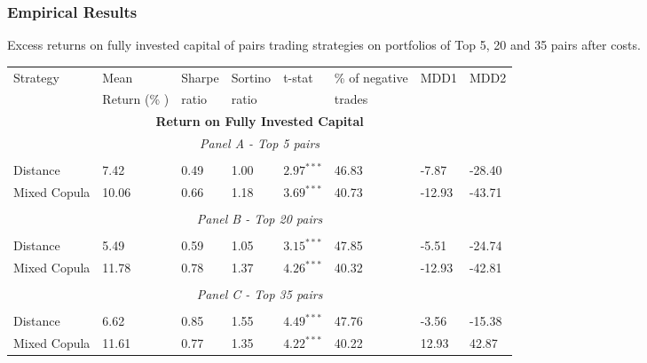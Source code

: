 \documentclass[pdf,9pt,xcolor=dvipsnames,hide notes]{beamer}
\begin{document}
\begin{frame}
	\frametitle{Empirical Results}
	\begin{threeparttable}[H]
		\centering \tiny
		\caption{Excess returns on fully invested capital of pairs trading strategies on portfolios of Top 5, 20 and 35 pairs after costs. }
		\begin{tabularx}{\textwidth}{@{\extracolsep{\fill}}llllllll@{}}
			\toprule
			Strategy & Mean  & Sharpe & Sortino & t-stat & \% of negative   & MDD1 & MDD2 \\
			& Return (\% ) & ratio &  ratio     &  &  trades     &       &  \\
			\midrule
			\multicolumn{8}{c}{\textbf{Return on Fully Invested Capital}} \\
			\multicolumn{8}{c}{\textit{Panel A - Top 5 pairs}} \\
			&       &       &       &       &       &       &  \\
			Distance & 7.42  & 0.49  & 1.00  & $2.97^{***}$  & 46.83 & -7.87    & -28.40 \\
			Mixed Copula & 10.06  & 0.66  & 1.18  & $3.69^{***}$  & 40.73 & -12.93  & -43.71 \\
			\multicolumn{1}{r}{} & \multicolumn{1}{r}{} & \multicolumn{1}{r}{} & \multicolumn{1}{r}{} & \multicolumn{1}{r}{} & \multicolumn{1}{r}{} & \multicolumn{1}{r}{} & \multicolumn{1}{r}{} \\
			\multicolumn{8}{c}{\textit{Panel B - Top 20 pairs}} \\
			&       &       &       &       &       &       &  \\
			Distance & 5.49  & 0.59  & 1.05  & $ 3.15^{***}$  & 47.85 & -5.51  & -24.74 \\
			Mixed Copula  & 11.78  & 0.78  & 1.37  & $4.26^{***}$  & 40.32  & -12.93  & -42.81  \\
			\multicolumn{1}{r}{} & \multicolumn{1}{r}{} & \multicolumn{1}{r}{} & \multicolumn{1}{r}{} & \multicolumn{1}{r}{} & \multicolumn{1}{r}{} & \multicolumn{1}{r}{} & \multicolumn{1}{r}{} \\
			\multicolumn{8}{c}{\textit{Panel C - Top 35 pairs}} \\
			&       &       &       &       &       &       &  \\
			Distance & 6.62  & 0.85  & 1.55  & $4.49^{***}$  & 47.76 & -3.56  & -15.38 \\
			Mixed Copula & 11.61 & 0.77  & 1.35  & $4.22^{***}$  & 40.22 & 12.93 & 42.87 \\
			

\end{tabularx}
\end{threeparttable}
\end{frame}
\end{document}

